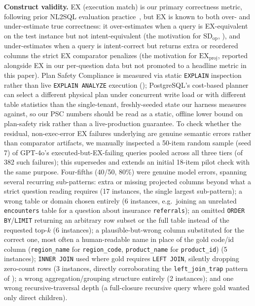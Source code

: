 \documentclass[twocolumn]{svjour3}
\begin{document}
\textbf{Construct validity.}
EX (execution match) is our primary correctness metric, following prior NL2SQL evaluation practice~\cite{yu2018spider,li2023can}, but EX is known to both over- and under-estimate true correctness: it over-estimates when a query is EX-equivalent on the test instance but not intent-equivalent (the motivation for $\text{SD}_{\text{op}}$, ), and under-estimates when a query is intent-correct but returns extra or reordered columns the strict EX comparator penalizes (the motivation for $\text{EX}_{\text{proj}}$, reported alongside EX in our per-question data but not promoted to a headline metric in this paper).
Plan Safety Compliance is measured via static \texttt{EXPLAIN} inspection rather than live \texttt{EXPLAIN ANALYZE} execution (); PostgreSQL's cost-based planner can select a different physical plan under concurrent write load or with different table statistics than the single-tenant, freshly-seeded state our harness measures against, so our PSC numbers should be read as a static, offline lower bound on plan-safety risk rather than a live-production guarantee.
To check whether the residual, non-exec-error EX failures underlying  are genuine semantic errors rather than comparator artifacts, we manually inspected a 50-item random sample (seed 7) of GPT-4o's executed-but-EX-failing queries pooled across all three tiers (of 382 such failures); this supersedes and extends an initial 18-item pilot check with the same purpose.
Four-fifths (40/50, 80\%) were genuine model errors, spanning several recurring sub-patterns: extra or missing projected columns beyond what a strict question reading requires (17 instances, the single largest sub-pattern); a wrong table or domain chosen entirely (6 instances, e.g.\ joining an unrelated \texttt{encounters} table for a question about insurance \texttt{referrals}); an omitted \texttt{ORDER BY}/\texttt{LIMIT} returning an arbitrary row subset or the full table instead of the requested top-$k$ (6 instances); a plausible-but-wrong column substituted for the correct one, most often a human-readable name in place of the gold code/id column (\texttt{region\_name} for \texttt{region\_code}, \texttt{product\_name} for \texttt{product\_id}) (5 instances); \texttt{INNER JOIN} used where gold requires \texttt{LEFT JOIN}, silently dropping zero-count rows (3 instances, directly corroborating the \texttt{left\_join\_trap} pattern of ); a wrong aggregation/grouping structure entirely (2 instances); and one wrong recursive-traversal depth (a full-closure recursive query where gold wanted only direct children).
\end{document}
